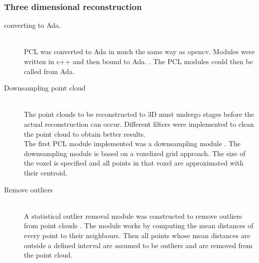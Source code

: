 \subsubsection{Three dimensional reconstruction} 
\begin{description}
\item[converting to Ada.]\hfill \\
PCL was converted to Ada in much the same way as opencv. Modules were written in c++ and then bound to Ada. \cite{web:newAdaBindings}. The PCL modules could then be called from Ada.

\item[Downsampling point cloud]\hfill \\
The point clouds to be reconstructed to 3D must undergo stages before the actual reconstruction can occur. Different filters were implemented to clean the point cloud to obtain better results.
\\The first PCL module implemented was a downsampling module \cite{web:pclVoxel} . The downsampling module is based on a voxelized grid approach. The size of the voxel is specified and all points in that voxel are approximated with their centroid.	

\item[Remove outliers]\hfill \\
A statistical outlier removal module was constructed to remove outliers from point clouds \cite{web:pclOutliers}. The module works by computing the mean distances of every point to their neighbours. Then all points whose mean distances are outside a defined interval are assumed to be outliers and are removed from the point cloud.
\end{description}